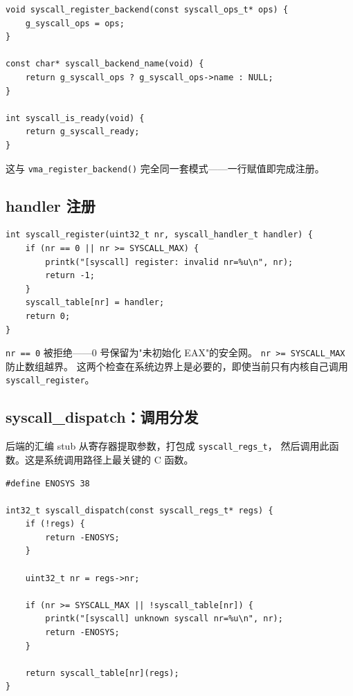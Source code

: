 \begin{lstlisting}[style=cstyle]
void syscall_register_backend(const syscall_ops_t* ops) {
    g_syscall_ops = ops;
}

const char* syscall_backend_name(void) {
    return g_syscall_ops ? g_syscall_ops->name : NULL;
}

int syscall_is_ready(void) {
    return g_syscall_ready;
}
\end{lstlisting}

这与 \texttt{vma\_register\_backend()} 完全同一套模式——一行赋值即完成注册。

\subsection{handler 注册}

\begin{lstlisting}[style=cstyle]
int syscall_register(uint32_t nr, syscall_handler_t handler) {
    if (nr == 0 || nr >= SYSCALL_MAX) {
        printk("[syscall] register: invalid nr=%u\n", nr);
        return -1;
    }
    syscall_table[nr] = handler;
    return 0;
}
\end{lstlisting}

\begin{warnbox}
\texttt{nr == 0} 被拒绝——0 号保留为"未初始化 EAX"的安全网。
\texttt{nr >= SYSCALL\_MAX} 防止数组越界。
这两个检查在系统边界上是必要的，即使当前只有内核自己调用 \texttt{syscall\_register}。
\end{warnbox}

\subsection{syscall\_dispatch：调用分发}
\label{sec:syscall-dispatch-fn}

后端的汇编 stub 从寄存器提取参数，打包成 \texttt{syscall\_regs\_t}，
然后调用此函数。这是系统调用路径上最关键的 C 函数。

\begin{lstlisting}[style=cstyle]
#define ENOSYS 38

int32_t syscall_dispatch(const syscall_regs_t* regs) {
    if (!regs) {
        return -ENOSYS;
    }

    uint32_t nr = regs->nr;

    if (nr >= SYSCALL_MAX || !syscall_table[nr]) {
        printk("[syscall] unknown syscall nr=%u\n", nr);
        return -ENOSYS;
    }

    return syscall_table[nr](regs);
}
\end{lstlisting}

